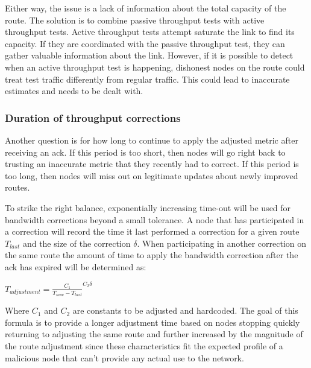 \documentclass[11pt]{article}
\begin{document}
Either way, the issue is a lack of information about the total capacity of the route. The solution is to combine passive throughput tests with active throughput tests. Active throughput tests attempt saturate the link to find its capacity. If they are coordinated with the passive throughput test, they can gather valuable information about the link. However, if it is possible to detect when an active throughput test is happening, dishonest nodes on the route could treat test traffic differently from regular traffic. This could lead to inaccurate estimates and needs to be dealt with.

\subsubsection{Duration of throughput corrections}


Another question is for how long to continue to apply the adjusted metric after receiving an ack. If this period is too short, then nodes will go right back to trusting an inaccurate metric that they recently had to correct. If this period is too long, then nodes will miss out on legitimate updates about newly improved routes.

To strike the right balance, exponentially increasing time-out will be used for bandwidth corrections beyond a small tolerance. A node that has participated in a correction will record the time it last performed a correction for a given route $T_{last}$ and the size of the correction $\delta$. When participating in another correction on the same route the amount of time to apply the bandwidth correction after the ack has expired will be determined as:

\newline
$T_{adjustment} = \frac{C_1}{T_{now} - T_{last}}^{C_2\delta}$
\newline

Where $C_1$ and  $C_2$ are constants to be adjusted and hardcoded. The goal of this formula is to provide a longer adjustment time based on nodes stopping quickly returning to adjusting the same route and further increased by the magnitude of the route adjustment since these characteristics fit the expected profile of a malicious node that can't provide any actual use to the network.
\end{document}
